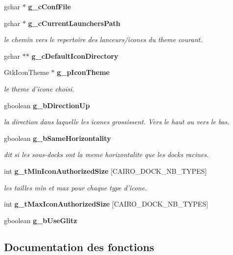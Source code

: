\begin{CompactItemize}
gchar $\ast$ {\bf g\_\-c\-Conf\-File}
\item 
gchar $\ast$ {\bf g\_\-c\-Current\-Launchers\-Path}
\begin{CompactList}\small\item\em le chemin vers le repertoire des lanceurs/icones du theme courant. \item\end{CompactList}\item 
gchar $\ast$$\ast$ {\bf g\_\-c\-Default\-Icon\-Directory}
\item 
Gtk\-Icon\-Theme $\ast$ {\bf g\_\-p\-Icon\-Theme}
\begin{CompactList}\small\item\em le theme d'icone choisi. \item\end{CompactList}\item 
gboolean {\bf g\_\-b\-Direction\-Up}
\begin{CompactList}\small\item\em la direction dans laquelle les icones grossissent. Vers le haut ou vers le bas. \item\end{CompactList}\item 
gboolean {\bf g\_\-b\-Same\-Horizontality}
\begin{CompactList}\small\item\em dit si les sous-docks ont la meme horizontalite que les docks racines. \item\end{CompactList}\item 
int {\bf g\_\-t\-Min\-Icon\-Authorized\-Size} [CAIRO\_\-DOCK\_\-NB\_\-TYPES]
\begin{CompactList}\small\item\em les tailles min et max pour chaque type d'icone. \item\end{CompactList}\item 
int {\bf g\_\-t\-Max\-Icon\-Authorized\-Size} [CAIRO\_\-DOCK\_\-NB\_\-TYPES]
\item 
gboolean {\bf g\_\-b\-Use\-Glitz}
\end{CompactItemize}


\subsection{Documentation des fonctions}
